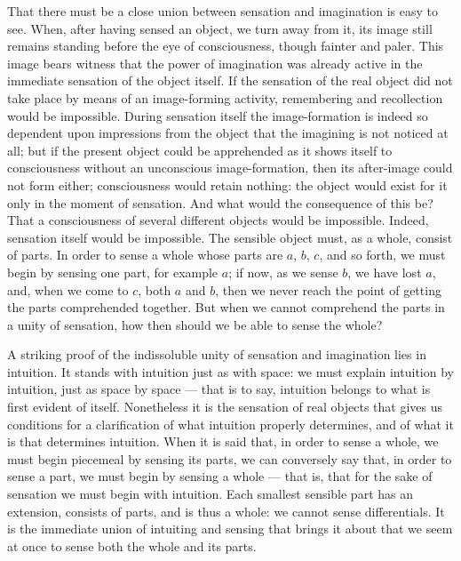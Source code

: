 \documentclass[12pt]{book}
\begin{document}
That there must be a close union between sensation and imagination is easy to
see. When, after having sensed an object, we turn away from it, its image
still remains standing before the eye of consciousness, though fainter and
paler. This image bears witness that the power of imagination was already
active in the immediate sensation of the object itself. If the sensation of
the real object did not take place by means of an image-forming activity,
remembering and recollection would be impossible. During sensation itself the
image-formation is indeed so dependent upon impressions from the object that
the imagining is not noticed at all; but if the present object could be
apprehended as it shows itself to consciousness without an unconscious
image-formation, then its after-image could not form either; consciousness
would retain nothing: the object would exist for it only in the moment of
sensation. And what would the consequence of this be? That a consciousness of
several different objects would be impossible. Indeed, sensation itself would
be impossible. The sensible object must, as a whole, consist of parts. In
order to sense a whole whose parts are $a$, $b$, $c$, and so forth, we must
begin by sensing one part, for example $a$; if now, as we sense $b$, we have
lost $a$, and, when we come to $c$, both $a$ and $b$, then we never reach the
point of getting the parts comprehended together. But when we cannot
comprehend the parts in a unity of sensation, how then should we be able to
sense the whole?

A striking proof of the indissoluble unity of sensation and imagination lies
in intuition. It stands with intuition just as with space: we must explain
intuition by intuition, just as space by space --- that is to say, intuition
belongs to what is first evident of itself. Nonetheless it is the sensation of
real objects that gives us conditions for a clarification of what intuition
properly determines, and of what it is that determines intuition. When it is
said that, in order to sense a whole, we must begin piecemeal by sensing its
parts, we can conversely say that, in order to sense a part, we must begin by
sensing a whole --- that is, that for the sake of sensation we must begin with
intuition. Each smallest sensible part has an extension, consists of parts,
and is thus a whole: we cannot sense differentials. It is the immediate union
of intuiting and sensing that brings it about that we seem at once to sense
both the whole and its parts.
\end{document}
